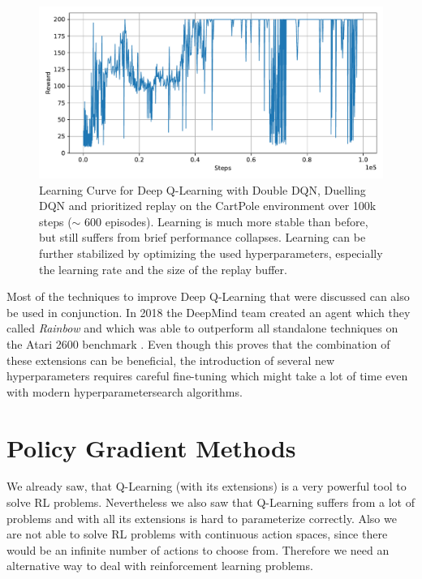 \begin{figure}[t]
  
  \begin{center}
      \includegraphics[clip, width=0.8\columnwidth]{figures/rl/dqn_extensions_cart_pole_plot.pdf}
  \end{center}
  
  \caption[Learning Curve for DQN with Extensions on CartPole]{Learning Curve for Deep Q-Learning with Double DQN, Duelling DQN and prioritized replay on the CartPole environment over 100k steps ($\sim$ 600 episodes). Learning is much more stable than before, but still suffers from brief performance collapses. Learning can be further stabilized by optimizing the used hyperparameters, especially the learning rate and the size of the replay buffer.}
  \label{fig:learning_curve_dqn}
\end{figure}



Most of the techniques to improve Deep Q-Learning that were discussed can also be used in conjunction. In 2018 the DeepMind team created an agent which they called \textit{Rainbow} and which was able to outperform all standalone techniques on the Atari 2600 benchmark \cite{hessel2018rainbow}. Even though this proves that the combination of these extensions can be beneficial, the introduction of several new hyperparameters requires careful fine-tuning which might take a lot of time even with modern hyperparametersearch algorithms. 

\section{Policy Gradient Methods} \label{sec:PGMethods}
We already saw, that Q-Learning (with its extensions) is a very powerful tool to solve RL problems. Nevertheless we also saw that Q-Learning suffers from a lot of problems and with all its extensions is hard to parameterize correctly. Also we are not able to solve RL problems with continuous action spaces, since there would be an infinite number of actions to choose from. Therefore we need an alternative way to deal with reinforcement learning problems.

